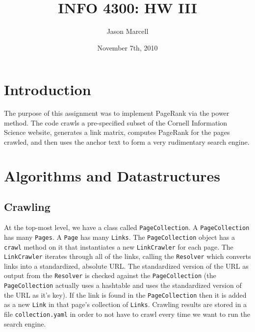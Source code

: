 \documentclass[12pt]{article}
\title{INFO 4300: HW III}
\author{Jason Marcell}
\date{November 7th, 2010}
\begin{document}
 
\maketitle 
\newpage
\section{Introduction} %
\label{sec:introduction}
The purpose of this assignment was to implement PageRank via the power method. The code crawls a pre-specified subset of the Cornell Information Science website, generates a link matrix, computes PageRank for the pages crawled, and then uses the anchor text to form a very rudimentary search engine.
\section{Algorithms and Datastructures} %
\label{sec:algorithms_and_datastructures}
\subsection{Crawling} %
\label{sub:crawling}
At the top-most level, we have a class called \texttt{PageCollection}. A \texttt{PageCollection} has many \texttt{Pages}. A \texttt{Page} has many \texttt{Links}. The \texttt{PageCollection} object has a \texttt{crawl} method on it that instantiates a new \texttt{LinkCrawler} for each page. The \texttt{LinkCrawler} iterates through all of the links, calling the \texttt{Resolver} which converts links into a standardized, absolute URL. The standardized version of the URL as output from the \texttt{Resolver} is checked against the \texttt{PageCollection} (the \texttt{PageCollection} actually uses a hashtable and uses the standardized version of the URL as it's key). If the link is found in the \texttt{PageCollection} then it is added as a new \texttt{Link} in that page's collection of \texttt{Links}. Crawling results are stored in a file \texttt{collection.yaml} in order to not have to crawl every time we want to run the search engine.
\newpage
\end{document}
